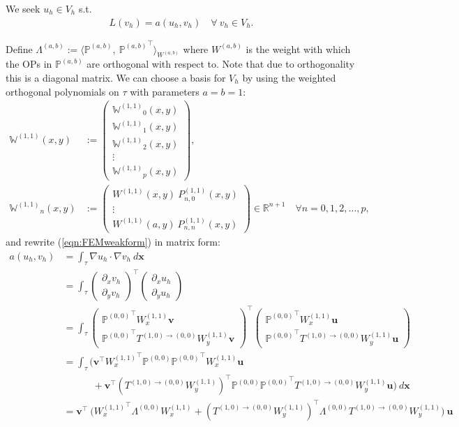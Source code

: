 \documentclass[11pt, oneside]{article}   	%
\newcommand{\R}{\mathbb{R}}
\newcommand{\bigP}{\mathbb{P}}
\newcommand{\Wii}{W^{(1,1)}}
\newcommand{\Pii}{P^{(1,1)}}
\newcommand{\bigPoo}{{\mathbb{P}^{(0,0)}}}
\newcommand{\element}{\tau}
\newcommand{\bigWii}{{\mathbb{W}^{(1,1)}}}
\begin{document}
We seek $u_h \in V_h$ s.t.
\begin{align}
	L(v_h) = a(u_h,v_h) \quad \forall \: v_h \in V_h.
	\label{eqn:FEMweakform}
\end{align}

Define $\Lambda^{(a,b)} := \langle \bigP^{(a,b)}, \: {\bigP^{(a,b)}}^\top \rangle_{W^{(a,b)}}$ where $W^{(a,b)}$ is the weight with which the OPs in $\bigP^{(a,b)}$ are orthogonal with respect to. Note that due to orthogonality this is a diagonal matrix. We can choose a basis for $V_h$ by using the weighted orthogonal polynomials on $\element$ with parameters $a = b = 1$:
\begin{align}
\bigWii(x,y) &:= \begin{pmatrix}
		\bigWii_0(x,y) \\
		\bigWii_1(x,y) \\
		\bigWii_2(x,y) \\
		\vdots \\
		\bigWii_p(x,y)
	\end{pmatrix}, \\
\bigWii_n(x,y) &:= \begin{pmatrix}
		\Wii(x,y) \: \Pii_{n,0}(x,y) \\
		\vdots \\
		\Wii(a,y) \: \Pii_{n,n}(x,y)
	\end{pmatrix} \in \R^{n+1} \quad \forall n = 0,1,2,\dots,p,
\end{align}
and rewrite (\ref{eqn:FEMweakform}) in matrix form:
\begin{align}
	a(u_h,v_h) &= \int_\element \nabla u_h \cdot \nabla v_h \: d\mathbf{x} \\
	&= \int_\element \begin{pmatrix}
					\partial_x v_h \\
					\partial_y v_h
				\end{pmatrix}^\top 
				\begin{pmatrix}
					\partial_x u_h \\
					\partial_y u_h
				\end{pmatrix}
				\\
	&= \int_\element \begin{pmatrix}
					\bigPoo^\top \Wii_x \mathbf{v} \\
					\bigPoo^\top T^{(1,0)\to(0,0)} \Wii_y \mathbf{v}
				\end{pmatrix}^\top 
				\begin{pmatrix}
					\bigPoo^\top \Wii_x \mathbf{u} \\
					\bigPoo^\top T^{(1,0)\to(0,0)} \Wii_y \mathbf{u}
				\end{pmatrix}
				\\
	&= \int_\element \Big( \mathbf{v}^\top {\Wii_x}^\top \bigPoo \bigPoo^\top \Wii_x \mathbf{u} \nonumber \\
					& \quad \quad \quad + \mathbf{v}^\top ({T^{(1,0)\to(0,0)} \Wii_y})^\top \bigPoo \bigPoo^\top T^{(1,0)\to(0,0)} \Wii_y \mathbf{u}  \Big) \: d\mathbf{x} \\
	&= \mathbf{v}^\top \: \Big( {\Wii_x}^\top \Lambda^{(0,0)} \Wii_x + ({T^{(1,0)\to(0,0)} \Wii_y})^\top \Lambda^{(0,0)} T^{(1,0)\to(0,0)} \Wii_y \Big) \: \mathbf{u}
\end{align}
\end{document}
